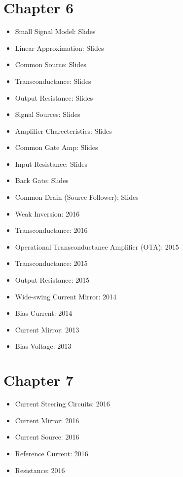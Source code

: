 \documentclass[twocolumn]{article}
\begin{document}
  \section*{Chapter 6}
    \begin{itemize}
      \item Small Signal Model: Slides
      \item Linear Approximation: Slides
      \item Common Source: Slides
      \item Transconductance: Slides
      \item Output Resistance: Slides
      \item Signal Sources: Slides
      \item Amplifier Charecteristics: Slides
      \item Common Gate Amp: Slides
      \item Input Resistance: Slides
      \item Back Gate: Slides
      \item Common Drain (Source Follower): Slides

      \item Weak Inversion: 2016
      \item Transconductance: 2016

      \item Operational Transconductance Amplifier (OTA): 2015
      \item Transconductance: 2015
      \item Output Resistance: 2015

      \item Wide-swing Current Mirror: 2014
      \item Bias Current: 2014

      \item Current Mirror: 2013
      \item Bias Voltage: 2013
    \end{itemize}
  \section*{Chapter 7}
    \begin{itemize}
      \item Current Steering Circuits: 2016
      \item Current Mirror: 2016
      \item Current Source: 2016
      \item Reference Current: 2016
      \item Resistance: 2016
    \end{itemize}
\end{document}
